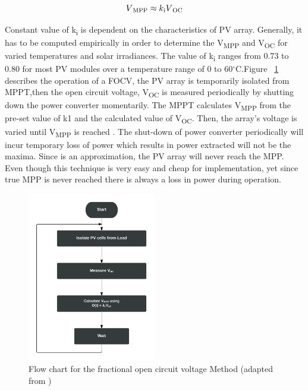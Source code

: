 {  \begin{equation}
    \begin{aligned}
  V\textsubscript{MPP}\approx k\textsubscript{i}V\textsubscript{OC}
  \label{eq:equ_fracoc}
  \end{aligned}
  \end{equation}
  
  Constant value of k\textsubscript{i} is dependent on the characteristics of PV array. Generally, it has to be computed empirically in order to determine the V\textsubscript{MPP} and V\textsubscript{OC} for varied temperatures and solar irradiances. The value of k\textsubscript{i} ranges from 0.73 to 0.80  for most PV modules over a temperature range of 0 to 60$^\circ$C.Figure ~\ref{fig:focflow} describes the operation of a \ac{FOCV}, the PV array is temporarily isolated from \ac{MPPT},then the open circuit voltage, V\textsubscript{OC} is measured periodically by shutting down the power converter momentarily. The \ac{MPPT} calculates V\textsubscript{MPP} from the pre-set value of k1 and the calculated value of V\textsubscript{OC}. Then, the array's voltage is varied until V\textsubscript{MPP} is  reached . The shut-down of power converter periodically will incur temporary loss of power which results in power extracted will not be the maxima. Since is an approximation, the PV array will never reach the \ac{MPP}. Even though this technique is very easy and cheap for implementation, yet since true \ac{MPP} is never reached there is always a loss in power during operation\cite{ngan2011study}.
  
  \begin{figure}[H]
        \begin{center}
        \includegraphics[width=0.5\textwidth]{images/Vopen_circuit_Flow}       %
        \caption{ Flow chart for the fractional open circuit voltage Method (adapted from \cite{reza2013classification})}
        \label{fig:focflow}
        \end{center}
        \end{figure}
  
}
